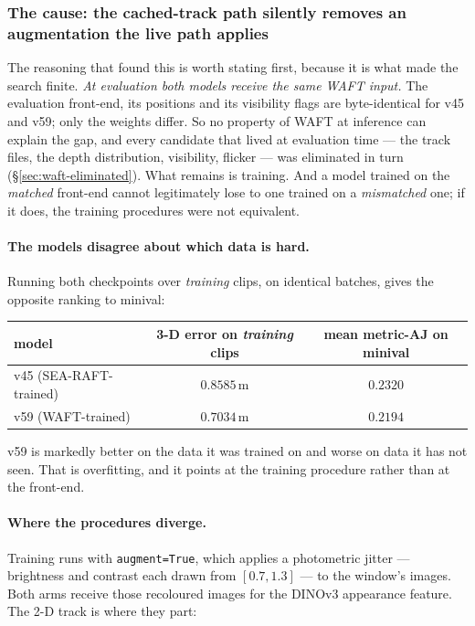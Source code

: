 \documentclass[11pt,a4paper]{article}
\begin{document}
\subsubsection{The cause: the cached-track path silently removes an augmentation the live path applies}
\label{sec:waft-aug-asymmetry}

The reasoning that found this is worth stating first, because it is what made the search finite.
\emph{At evaluation both models receive the same WAFT input.} The evaluation front-end, its
positions and its visibility flags are byte-identical for v45 and v59; only the weights differ. So
no property of WAFT at inference can explain the gap, and every candidate that lived at evaluation
time --- the track files, the depth distribution, visibility, flicker --- was eliminated in turn
(\S\ref{sec:waft-eliminated}). What remains is training. And a model trained on the \emph{matched}
front-end cannot legitimately lose to one trained on a \emph{mismatched} one; if it does, the
training procedures were not equivalent.

\paragraph{The models disagree about which data is hard.} Running both checkpoints over
\emph{training} clips, on identical batches, gives the opposite ranking to minival:

\begin{center}
\begin{tabular}{lcc}
\toprule
model & 3-D error on \emph{training} clips & mean metric-AJ on minival \\
\midrule
v45 (SEA-RAFT-trained) & $0.8585$\,m & $\mathbf{0.2320}$ \\
v59 (WAFT-trained)     & $\mathbf{0.7034}$\,m & $0.2194$ \\
\bottomrule
\end{tabular}
\end{center}

\noindent v59 is markedly better on the data it was trained on and worse on data it has not seen.
That is overfitting, and it points at the training procedure rather than at the front-end.

\paragraph{Where the procedures diverge.} Training runs with \texttt{augment=True}, which applies a
photometric jitter --- brightness and contrast each drawn from $[0.7,1.3]$ --- to the window's
images. Both arms receive those recoloured images for the DINOv3 appearance feature. The 2-D track
is where they part:
\end{document}
